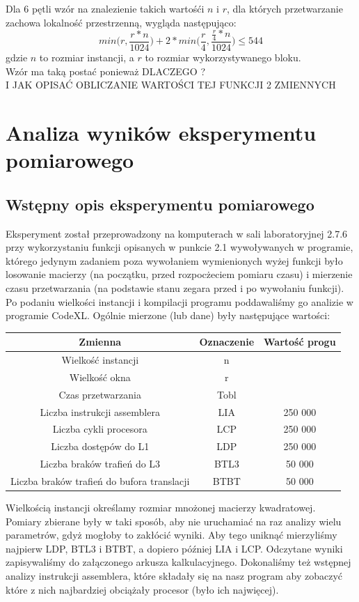 \documentclass[10pt,a4paper]{article}
\begin{document}
Dla 6 pętli wzór na znalezienie takich wartośći $n$ i $r$, dla których przetwarzanie zachowa
lokalność przestrzenną, wygląda następująco:
$$
    min\Big(r, \frac{r*n}{1024}\Big) + 2*min\Big(\frac{r}{4}, \frac{\frac{r}{4} * n}{1024}\Big) \leq 544
$$
gdzie $n$ to rozmiar instancji, a $r$ to rozmiar wykorzystywanego bloku.\\
Wzór ma taką postać ponieważ DLACZEGO ? \\ I JAK OPISAĆ OBLICZANIE WARTOŚCI TEJ FUNKCJI 2 ZMIENNYCH
\\
\section{Analiza wyników eksperymentu pomiarowego}
\subsection{Wstępny opis eksperymentu pomiarowego}
Eksperyment został przeprowadzony na komputerach w sali laboratoryjnej 2.7.6 przy
wykorzystaniu funkcji opisanych w punkcie 2.1 wywoływanych w programie, którego jedynym
zadaniem poza wywołaniem wymienionych wyżej funkcji było losowanie macierzy
(na początku, przed rozpocżeciem pomiaru czasu) i mierzenie czasu przetwarzania
(na podstawie stanu zegara przed i po wywołaniu funkcji). Po podaniu wielkości instancji
i kompilacji programu poddawaliśmy go analizie w programie CodeXL. Ogólnie mierzone (lub dane)
były następujące wartości:
\begin{center}
    \begin{tabular}{ |c|c|c| }
        \hline
        Zmienna & Oznaczenie & Wartość progu \\
        \hline
        Wielkość instancji & n &  \\
        Wielkość okna & r &  \\
        Czas przetwarzania & Tobl &  \\
        Liczba instrukcji assemblera & LIA &  250 000\\
        Liczba cykli procesora & LCP & 250 000 \\
        Liczba dostępów do L1 & LDP & 250 000 \\
        Liczba braków trafień do L3 & BTL3 & 50 000 \\
        Liczba braków trafień do bufora translacji & BTBT & 50 000 \\
        \hline
    \end{tabular}
\end{center}
Wielkością instancji określamy rozmiar mnożonej macierzy kwadratowej.\\
Pomiary zbierane były w taki sposób, aby nie uruchamiać na raz analizy wielu
parametrów, gdyż mogłoby to zakłócić wyniki. Aby tego uniknąć mierzyliśmy najpierw 
LDP, BTL3 i BTBT, a dopiero później LIA i LCP. Odczytane wyniki zapisywaliśmy do 
załączonego arkusza kalkulacyjnego. Dokonaliśmy też wstępnej analizy instrukcji
assemblera, które składały się na nasz program aby zobaczyć które z nich najbardziej
obciążały procesor (było ich najwięcej).
\end{document}
